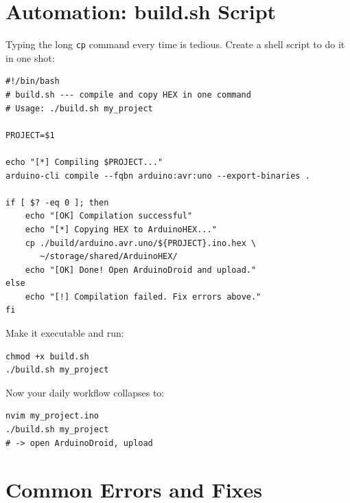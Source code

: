 \documentclass[12pt,a4paper,openany]{report}
\begin{document}
\section{Automation: build.sh Script}

Typing the long \texttt{cp} command every time is tedious. Create a shell script to do it in one shot:

\begin{lstlisting}[style=shell, caption={build.sh --- automate compile + copy}]
#!/bin/bash
# build.sh --- compile and copy HEX in one command
# Usage: ./build.sh my_project

PROJECT=$1

echo "[*] Compiling $PROJECT..."
arduino-cli compile --fqbn arduino:avr:uno --export-binaries .

if [ $? -eq 0 ]; then
    echo "[OK] Compilation successful"
    echo "[*] Copying HEX to ArduinoHEX..."
    cp ./build/arduino.avr.uno/${PROJECT}.ino.hex \
       ~/storage/shared/ArduinoHEX/
    echo "[OK] Done! Open ArduinoDroid and upload."
else
    echo "[!] Compilation failed. Fix errors above."
fi
\end{lstlisting}

Make it executable and run:

\begin{lstlisting}[style=shell]
chmod +x build.sh
./build.sh my_project
\end{lstlisting}

Now your daily workflow collapses to:

\begin{lstlisting}[style=terminal]
nvim my_project.ino
./build.sh my_project
# -> open ArduinoDroid, upload
\end{lstlisting}

\section{Common Errors and Fixes}
\end{document}
